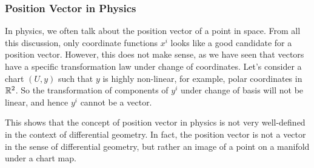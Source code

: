 \subsubsection{Position Vector in Physics}

In physics, we often talk about the position vector of a point in space. From all this discussion, only coordinate functions \(x^i\) looks like a good candidate for a position vector. However, this does not make sense, as we have seen that vectors have a specific transformation law under change of coordinates. Let's consider a chart \((U, y)\) such that \(y\) is highly non-linear, for example, polar coordinates in \(\mathbb R^2\). So the transformation of components of \(y^i\) under change of basis will not be linear, and hence \(y^i\) cannot be a vector.

This shows that the concept of position vector in physics is not very well-defined in the context of differential geometry. In fact, the position vector is not a vector in the sense of differential geometry, but rather an image of a point on a manifold under a chart map.
